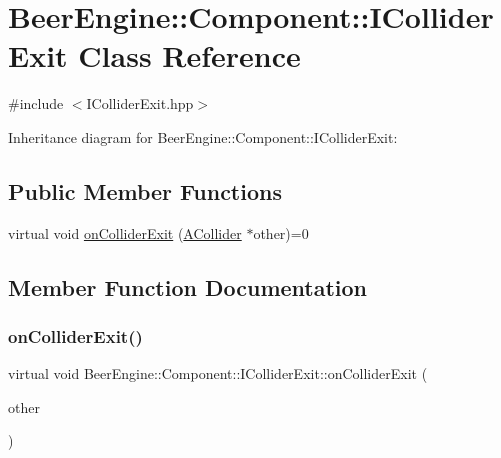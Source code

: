\hypertarget{class_beer_engine_1_1_component_1_1_i_collider_exit}{}\section{Beer\+Engine\+:\+:Component\+:\+:I\+Collider\+Exit Class Reference}
\label{class_beer_engine_1_1_component_1_1_i_collider_exit}


{\ttfamily \#include $<$I\+Collider\+Exit.\+hpp$>$}



Inheritance diagram for Beer\+Engine\+:\+:Component\+:\+:I\+Collider\+Exit\+:
\subsection*{Public Member Functions}
\begin{DoxyCompactItemize}
\item 
virtual void \mbox{\hyperlink{class_beer_engine_1_1_component_1_1_i_collider_exit_a3669477d0003535fbe0411449efc69e9}{on\+Collider\+Exit}} (\mbox{\hyperlink{class_beer_engine_1_1_component_1_1_a_collider}{A\+Collider}} $\ast$other)=0
\end{DoxyCompactItemize}


\subsection{Member Function Documentation}
\mbox{\label{class_beer_engine_1_1_component_1_1_i_collider_exit_a3669477d0003535fbe0411449efc69e9}} 
\subsubsection{\texorpdfstring{on\+Collider\+Exit()}{onColliderExit()}}
{\footnotesize\ttfamily virtual void Beer\+Engine\+::\+Component\+::\+I\+Collider\+Exit\+::on\+Collider\+Exit (\begin{DoxyParamCaption}\item[{\mbox{\hyperlink{class_beer_engine_1_1_component_1_1_a_collider}{A\+Collider}} $\ast$}]{other }\end{DoxyParamCaption})\hspace{0.3cm}{\ttfamily [pure virtual]}}



